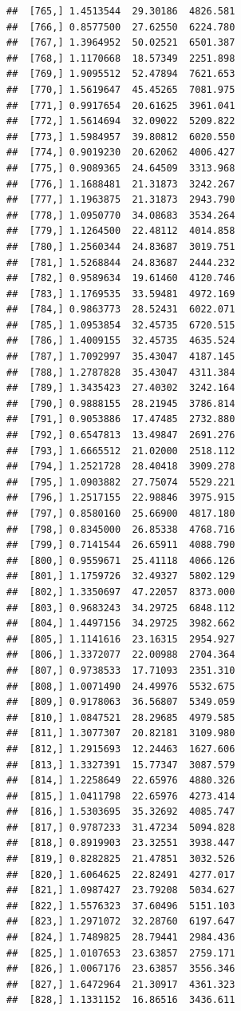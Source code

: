 \documentclass[article]{jss}\usepackage[]{graphicx}\usepackage[]{xcolor}
\makeatletter
\newenvironment{kframe}{%
 \def\at@end@of@kframe{}%
 \ifinner\ifhmode%
  \def\at@end@of@kframe{\end{minipage}}%
  \begin{minipage}{\columnwidth}%
 \fi\fi%
 \def\FrameCommand##1{\hskip\@totalleftmargin \hskip-\fboxsep
 \colorbox{shadecolor}{##1}\hskip-\fboxsep
     \hskip-\linewidth \hskip-\@totalleftmargin \hskip\columnwidth}%
 \MakeFramed {\advance\hsize-\width
   \@totalleftmargin\z@ \linewidth\hsize
   \@setminipage}}%
 {\par\unskip\endMakeFramed%
 \at@end@of@kframe}
\newenvironment{knitrout}{}{} %
\makeatother
\begin{document}
\begin{knitrout}
\begin{kframe}
\begin{verbatim}
##  [765,] 1.4513544  29.30186  4826.581
##  [766,] 0.8577500  27.62550  6224.780
##  [767,] 1.3964952  50.02521  6501.387
##  [768,] 1.1170668  18.57349  2251.898
##  [769,] 1.9095512  52.47894  7621.653
##  [770,] 1.5619647  45.45265  7081.975
##  [771,] 0.9917654  20.61625  3961.041
##  [772,] 1.5614694  32.09022  5209.822
##  [773,] 1.5984957  39.80812  6020.550
##  [774,] 0.9019230  20.62062  4006.427
##  [775,] 0.9089365  24.64509  3313.968
##  [776,] 1.1688481  21.31873  3242.267
##  [777,] 1.1963875  21.31873  2943.790
##  [778,] 1.0950770  34.08683  3534.264
##  [779,] 1.1264500  22.48112  4014.858
##  [780,] 1.2560344  24.83687  3019.751
##  [781,] 1.5268844  24.83687  2444.232
##  [782,] 0.9589634  19.61460  4120.746
##  [783,] 1.1769535  33.59481  4972.169
##  [784,] 0.9863773  28.52431  6022.071
##  [785,] 1.0953854  32.45735  6720.515
##  [786,] 1.4009155  32.45735  4635.524
##  [787,] 1.7092997  35.43047  4187.145
##  [788,] 1.2787828  35.43047  4311.384
##  [789,] 1.3435423  27.40302  3242.164
##  [790,] 0.9888155  28.21945  3786.814
##  [791,] 0.9053886  17.47485  2732.880
##  [792,] 0.6547813  13.49847  2691.276
##  [793,] 1.6665512  21.02000  2518.112
##  [794,] 1.2521728  28.40418  3909.278
##  [795,] 1.0903882  27.75074  5529.221
##  [796,] 1.2517155  22.98846  3975.915
##  [797,] 0.8580160  25.66900  4817.180
##  [798,] 0.8345000  26.85338  4768.716
##  [799,] 0.7141544  26.65911  4088.790
##  [800,] 0.9559671  25.41118  4066.126
##  [801,] 1.1759726  32.49327  5802.129
##  [802,] 1.3350697  47.22057  8373.000
##  [803,] 0.9683243  34.29725  6848.112
##  [804,] 1.4497156  34.29725  3982.662
##  [805,] 1.1141616  23.16315  2954.927
##  [806,] 1.3372077  22.00988  2704.364
##  [807,] 0.9738533  17.71093  2351.310
##  [808,] 1.0071490  24.49976  5532.675
##  [809,] 0.9178063  36.56807  5349.059
##  [810,] 1.0847521  28.29685  4979.585
##  [811,] 1.3077307  20.82181  3109.980
##  [812,] 1.2915693  12.24463  1627.606
##  [813,] 1.3327391  15.77347  3087.579
##  [814,] 1.2258649  22.65976  4880.326
##  [815,] 1.0411798  22.65976  4273.414
##  [816,] 1.5303695  35.32692  4085.747
##  [817,] 0.9787233  31.47234  5094.828
##  [818,] 0.8919903  23.32551  3938.447
##  [819,] 0.8282825  21.47851  3032.526
##  [820,] 1.6064625  22.82491  4277.017
##  [821,] 1.0987427  23.79208  5034.627
##  [822,] 1.5576323  37.60496  5151.103
##  [823,] 1.2971072  32.28760  6197.647
##  [824,] 1.7489825  28.79441  2984.436
##  [825,] 1.0107653  23.63857  2759.171
##  [826,] 1.0067176  23.63857  3556.346
##  [827,] 1.6472964  21.30917  4361.323
##  [828,] 1.1331152  16.86516  3436.611

\end{verbatim}
\end{kframe}
\end{knitrout}
\end{document}
